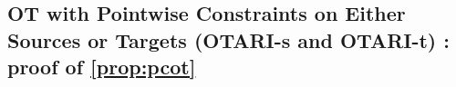     
    


\subsection{OT with Pointwise Constraints on Either Sources or Targets (OTARI-s and OTARI-t) : proof of \cref{prop:pcot}}\label{sec:proofs_otari}


